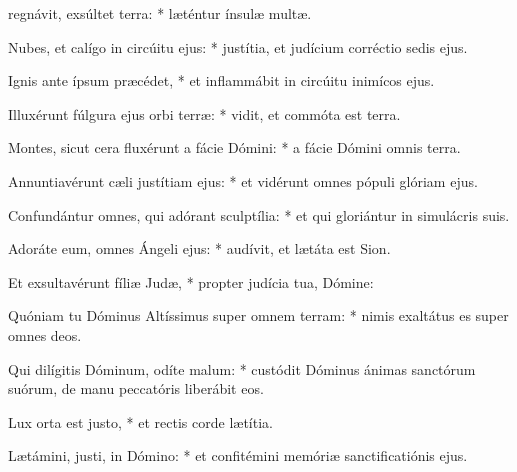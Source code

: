 \begin{psalmus}
    
     regnávit, exsúltet terra: * læténtur ínsulæ multæ.
    
    Nubes, et calígo in circúitu ejus: * justítia, et judícium corréctio sedis ejus.
    
    Ignis ante ípsum præcédet, * et inflammábit in circúitu inimícos ejus.
    
    Illuxérunt fúlgura ejus orbi terræ: * vidit, et commóta est terra.
    
    Montes, sicut cera fluxérunt a fácie Dómini: * a fácie Dómini omnis terra.
    
    Annuntiavérunt cæli justítiam ejus: * et vidérunt omnes pópuli glóriam ejus.
    
    Confundántur omnes, qui adórant sculptília: * et qui gloriántur in simulácris suis.
    
    Adoráte eum, omnes Ángeli ejus: * audívit, et lætáta est Sion.
    
    Et exsultavérunt fíliæ Judæ, * propter judícia tua, Dómine:
    
    Quóniam tu Dóminus Altíssimus super omnem terram: * nimis exaltátus es super omnes deos.
    
    Qui dilígitis Dóminum, odíte malum: * custódit Dóminus ánimas sanctórum suórum, de manu peccatóris liberábit eos.
    
    Lux orta est justo, * et rectis corde lætítia.
    
    Lætámini, justi, in Dómino: * et confitémini memóriæ sanctificatiónis ejus.
    
    \end{psalmus}
